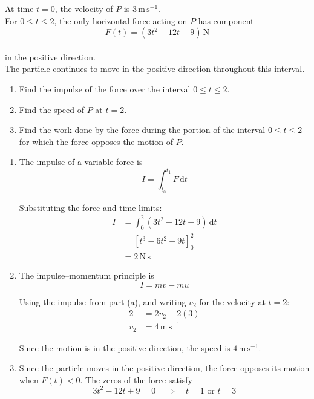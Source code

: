 \documentclass[leqno]{article}
\begin{document}
\begin{enumerate}[
  label=\textbf{\arabic*.},
  leftmargin=*,
  topsep=0pt,
  partopsep=0pt,
  parsep=0pt
]
At time $t=0$, the velocity of $P$ is $3\,\mathrm{m\,s^{-1}}$. \\
For $0\leq t\leq 2$, the only horizontal force acting on $P$ has component
\[
F(t)=(3t^2-12t+9)\,\mathrm{N}
\] \\
in the positive direction. \\
The particle continues to move in the positive direction throughout this interval. \\
\begin{enumerate}[label=\textbf{(\alph*)}]
\item Find the impulse of the force over the interval $0\leq t\leq 2$.  \\
\item Find the speed of $P$ at $t=2$.  \\
\item Find the work done by the force during the portion of the interval $0\leq t\leq 2$ for which the force opposes the motion of $P$.  \\
\end{enumerate}

\vspace*{10pt}

\begin{djsSolution}
\begin{enumerate}[label=\textbf{(\alph*)}, start=1]
\item The impulse of a variable force is
\[
I=\int_{t_0}^{t_1}F\,\mathrm{d}t
\]

Substituting the force and time limits:
\begin{align*}
I&=\int_0^2(3t^2-12t+9)\,\mathrm{d}t\\
&=\left[t^3-6t^2+9t\right]_0^2\\
&=2\,\mathrm{N\,s}
\end{align*}

\item The impulse--momentum principle is
\[
I=mv-mu
\]

Using the impulse from part (a), and writing \(v_2\) for the velocity at \(t=2\):
\begin{align*}
2&=2v_2-2(3)\\
v_2&=4\,\mathrm{m\,s^{-1}}
\end{align*}

Since the motion is in the positive direction, the speed is \(4\,\mathrm{m\,s^{-1}}\).

\item Since the particle moves in the positive direction, the force opposes its motion when \(F(t)<0\). The zeros of the force satisfy
\[
3t^2-12t+9=0
\quad\Longrightarrow\quad t=1\text{ or }t=3
\]


\end{enumerate}
\end{djsSolution}
\end{enumerate}
\end{document}
